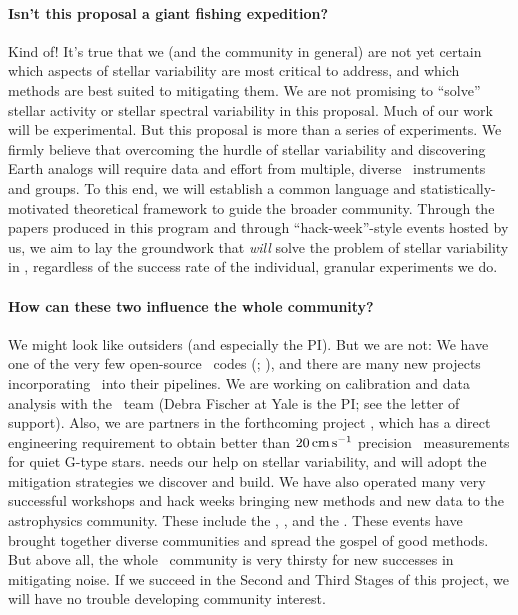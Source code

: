 \documentclass[12pt, letterpaper]{article}
\begin{document}
\paragraph{Isn't this proposal a giant fishing expedition?}
Kind of! It's true that we (and the community in general) are not yet certain 
which aspects of stellar variability are most critical to address, and which 
methods are best suited to mitigating them. We are not promising to 
``solve'' stellar activity or stellar spectral variability in this proposal.
Much of our work will be 
experimental. But this proposal is more than a series of experiments. 
We firmly believe that overcoming the hurdle of stellar variability and 
discovering Earth analogs will require data and effort from multiple, 
diverse \EPRV\ instruments and groups. To this end, we will establish 
a common language and statistically-motivated theoretical framework 
to guide the broader community. Through the papers produced in this 
program and through ``hack-week''-style events hosted by us, we aim to 
lay the groundwork that \textit{will} solve the problem of stellar variability 
in \EPRV, regardless of the success rate of the individual, granular experiments we do. 

\paragraph{How can these two influence the whole community?}
We might look like outsiders (and especially the PI).
But we are not: We have one of the very few open-source \EPRV\ codes
(\wobble; \citealt{Bedell2019}), and there are many new projects incorporating 
\wobble\ into their pipelines.
We are working on calibration and data analysis with the \EXPRES\ team (Debra Fischer
at Yale is the PI; see the letter of support).
Also, we are partners in the forthcoming  project
, which has a direct engineering
requirement to obtain better than $20\,{\mathrm{cm\,s^{-1}}}$ precision
\RV\ measurements for quiet G-type stars.
 needs our help on stellar variability, and will adopt
the mitigation strategies we discover and build.
We have also operated many very successful workshops and hack weeks
bringing new methods and new data to the astrophysics community.
These include the , , and the .
These events have brought together diverse communities and spread
the gospel of good methods.
But above all, the whole \EPRV\ community is very thirsty for new
successes in mitigating noise. If we succeed in the Second and Third
Stages of this project, we will have no trouble developing community
interest.
\end{document}
